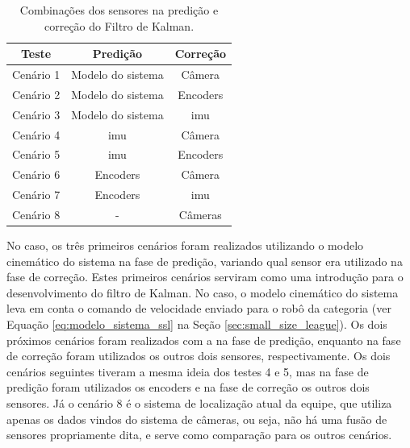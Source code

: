 \documentclass[acronym, symbols, table]{fei}
\begin{document}
		\begin{table}[!htb]
			\centering
			\caption{Combinações dos sensores na predição e correção do Filtro de Kalman.}
			\label{tbl:combinacao_sensores}
			\begin{tabular}{|c|c|c|}
				\hline
				\textbf{Teste}   & \textbf{Predição} & \textbf{Correção} \\ \hline
				Cenário 1 		 & Modelo do sistema & Câmera   		 \\ \hline
				Cenário 2 		 & Modelo do sistema & Encoders 		 \\ \hline
				Cenário 3 		 & Modelo do sistema & \acrshort{imu} 	 \\ \hline
				Cenário 4 		 & \acrshort{imu}    & Câmera   		 \\ \hline
				Cenário 5 		 & \acrshort{imu}    & Encoders 		 \\ \hline
				Cenário 6 		 & Encoders          & Câmera   		 \\ \hline
				Cenário 7 		 & Encoders          & \acrshort{imu} 	 \\ \hline
				Cenário 8 		 & - 			 	 & Câmeras 			 \\ \hline
			\end{tabular}
		\end{table}
		
		No caso, os três primeiros cenários foram realizados utilizando o modelo cinemático do sistema na fase de predição, variando qual sensor era utilizado na fase de correção. Estes primeiros cenários serviram como uma introdução para o desenvolvimento do filtro de Kalman. No caso, o modelo cinemático do sistema leva em conta o comando de velocidade enviado para o robô da categoria  (ver Equação \eqref{eq:modelo_sistema_ssl} na Seção \ref{sec:small_size_league}). Os dois próximos cenários foram realizados com a  na fase de predição, enquanto na fase de correção foram utilizados os outros dois sensores, respectivamente. Os dois cenários seguintes tiveram a mesma ideia dos testes 4 e 5, mas na fase de predição foram utilizados os encoders e na fase de correção os outros dois sensores. Já o cenário 8 é o sistema de localização atual da equipe, que utiliza apenas os dados vindos do sistema de câmeras, ou seja, não há uma fusão de sensores propriamente dita, e serve como comparação para os outros cenários.
		
\end{document}
